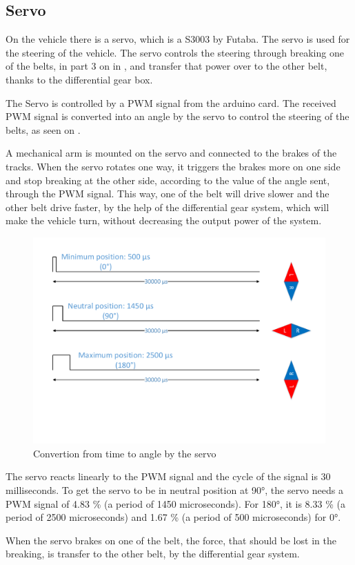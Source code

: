 \subsection{Servo}
On the vehicle there is a servo, which is a S3003 by Futaba. 
The servo is used for the steering of the vehicle. The servo controls the steering through breaking one of the belts, in part 3 on \figref{} in \secref{}, and transfer that power over to the other belt, thanks to the differential gear box.

The Servo is controlled by a PWM signal from the arduino card. The received PWM signal is converted into an angle by the servo to control the steering of the belts, as seen on .

A mechanical arm is mounted on the servo and connected to the brakes of the tracks. When the servo rotates one way, it triggers the brakes more on one side and stop breaking at the other side, according to the value of the angle sent, through the PWM signal. This way, one of the belt will drive slower and the other belt drive faster, by the help of the differential gear system, which will make the vehicle turn, without decreasing the output power of the system.

\begin{figure}[H]
	\centering
	\includegraphics[scale=0.6]{figures/TimeVSangle.pdf}
	\caption{Convertion from time to angle by the servo}
	\label{timeVSangle}
\end{figure}

The servo reacts linearly to the PWM signal and the cycle of the signal is 30 milliseconds. To get the servo to be in neutral position at 90°, the servo needs a PWM signal of 4.83 \% (a period of 1450 microseconds). For 180°, it is 8.33 \% (a period of 2500 microseconds) and 1.67 \% (a period of 500 microseconds) for 0°. \\

When the servo brakes on one of the belt, the force, that should be lost in the breaking, is transfer to the other belt, by the differential gear system.